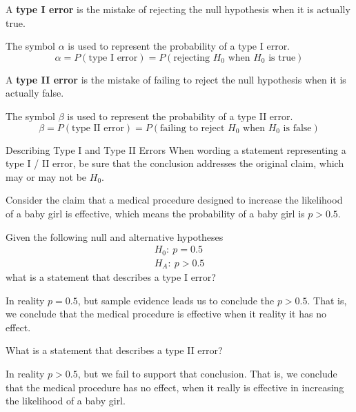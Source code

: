 \documentclass{beamer}
\newcommand{\prob}[1]{P\left(#1\right)}
\newcommand{\nullhypothesis}[1]{H_0:~{#1}}
\newcommand{\althypothesis}[1]{H_A:~{#1}}
\begin{document}
\begin{frame}
\begin{definition}
A \textbf{type I error} is the mistake of rejecting the null hypothesis when it is actually true.

\vspace{2mm}
The symbol $\alpha$ is used to represent the probability of a type I error.
\begin{equation*}
\alpha = \prob{\text{type I error}} = \prob{\text{rejecting $H_0$ when $H_0$ is true}}
\end{equation*}
\end{definition}\pause

\begin{definition}
A \textbf{type II error} is the mistake of failing to reject the null hypothesis when it is actually false.

\vspace{2mm}
The symbol $\beta$ is used to represent the probability of a type II error.
\begin{equation*}
\beta = \prob{\text{type II error}} = \prob{\text{failing to reject $H_0$ when $H_0$ is false}}
\end{equation*}
\end{definition}\pause

\begin{block}{Describing Type I and Type II Errors}
When wording a statement representing a type I / II error, be sure that the conclusion addresses the original claim, which may or may not be $H_0$.
\end{block}
\end{frame}

\begin{frame}
\begin{example}
Consider the claim that a medical procedure designed to increase the likelihood of a baby girl is effective, which means the probability of a baby girl is $p>0.5$.\pause

\vspace{2mm}
Given the following null and alternative hypotheses
\begin{equation*}
\begin{aligned}
\nullhypothesis{p=0.5} \\
\althypothesis{p>0.5}
\end{aligned}
\end{equation*}
what is a statement that describes a type I error?\pause

\vspace{2mm}
In reality $p=0.5$, but sample evidence leads us to conclude the $p>0.5$. That is, we conclude that the medical procedure is effective when it reality it has no effect.\pause

\vspace{2mm}
What is a statement that describes a type II error?\pause

\vspace{2mm}
In reality $p>0.5$, but we fail to support that conclusion. That is, we conclude that the medical procedure has no effect, when it really is effective in increasing the likelihood of a baby girl.
\end{example}
\end{frame}
\end{document}
